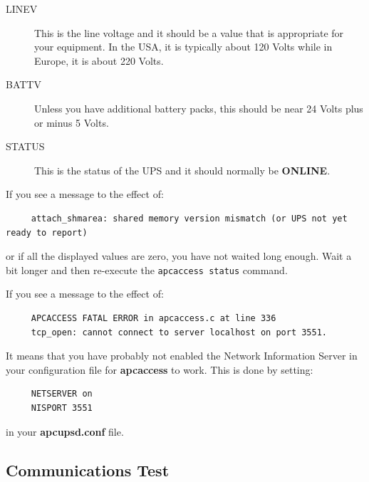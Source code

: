 \begin{description}

\item [LINEV]
   This is the line voltage and it should be a value that is appropriate for your
equipment. In the USA, it is typically about 120 Volts while in Europe, it is
about 220 Volts.  

\item [BATTV]
   Unless you have additional battery packs, this should be near 24 Volts plus or
minus 5 Volts.  

\item [STATUS]
   This is the status of the UPS and it should normally be {\bf ONLINE}. 
\end{description}

If you see a message to the effect of: 

\footnotesize
\begin{verbatim}
     attach_shmarea: shared memory version mismatch (or UPS not yet ready to report)
\end{verbatim}
\normalsize

or if all the displayed values are zero, you have not waited long enough. Wait
a bit longer and then re-execute the {\tt apcaccess status} command.  

If you see a message to the effect of: 

\footnotesize
\begin{verbatim}
     APCACCESS FATAL ERROR in apcaccess.c at line 336
     tcp_open: cannot connect to server localhost on port 3551.
\end{verbatim}
\normalsize

It means that you have probably not enabled the Network Information Server in
your configuration file for {\bf apcaccess} to work. This is done by setting: 

\footnotesize
\begin{verbatim}
     NETSERVER on
     NISPORT 3551
\end{verbatim}
\normalsize

in your {\bf apcupsd.conf} file. 

\label{Communications-Test}

\subsection*{Communications Test}

